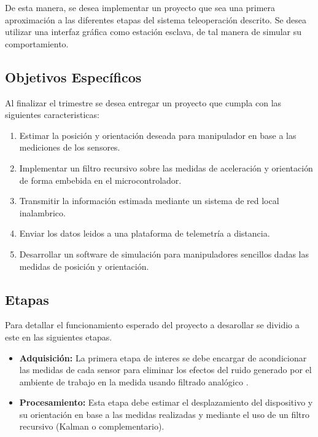 \documentclass{article}
\begin{document}
De esta manera, se desea implementar un proyecto que sea una primera aproximación a las diferentes etapas del sistema teleoperación descrito. Se desea utilizar una interfaz gráfica como estación esclava, de tal manera de simular su comportamiento.

\subsection{Objetivos Específicos}
 
Al finalizar el trimestre se desea entregar un proyecto que cumpla con las siguientes caracteristicas:
 
\begin{enumerate}
    \item Estimar la posici\'on y orientaci\'on deseada para manipulador en base a las mediciones de los sensores.
    \item Implementar un filtro recursivo sobre las medidas de aceleraci\'on y orientaci\'on de forma embebida en el microcontrolador.
    \item Transmitir la informaci\'on estimada mediante un sistema de red local inalambrico.
    \item Enviar los datos leidos a una plataforma de  telemetr\'ia a distancia.
    \item Desarrollar un software de simulaci\'on para manipuladores sencillos dadas las medidas de posici\'on y orientaci\'on.
\end{enumerate}

\subsection{Etapas}

Para detallar el funcionamiento esperado del proyecto a desarollar se dividio a este en las siguientes etapas.

\begin{itemize}
	\item \textbf{Adquisición:} La primera etapa de interes se debe encargar de acondicionar las medidas de cada sensor para eliminar los efectos del ruido generado por el ambiente de trabajo en la medida usando filtrado anal\'ogico .
\end{itemize}

\begin{itemize}
	\item \textbf{Procesamiento:} Esta etapa debe estimar el desplazamiento del dispositivo y su orientaci\'on en base a las medidas realizadas y mediante el uso de un filtro recursivo (Kalman o complementario).
\end{itemize}
\end{document}
